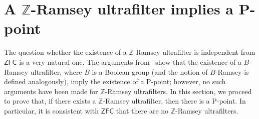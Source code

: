 \documentclass{amsart}
\newtheorem{theorem}{Theorem}[section]
\theoremstyle{definition}
\theoremstyle{remark}
\numberwithin{equation}{section}
\newcommand{\ZFC}{\mathsf{ZFC}}
\begin{document}




\section{A \texorpdfstring{$\mathbb{Z}$}{Lg}-Ramsey ultrafilter implies a P-point}

The question whether the existence of a $\mathbb Z$-Ramsey ultrafilter is independent from $\ZFC$ is a very natural one. The arguments from~\cite[p. 459]{MR3681104} show that the existence of a $B$-Ramsey ultrafilter, where $B$ is a Boolean group (and the notion of $B$-Ramsey is defined analogously), imply the existence of a P-point; however, no such arguments have been made for $\mathbb Z$-Ramsey ultrafilters. In this section, we proceed to prove that, if there exists a $\mathbb Z$-Ramsey ultrafilter, then there is a P-point. In particular, it is consistent with $\ZFC$ that there are no $\mathbb Z$-Ramsey ultrafilters.
\end{document}
